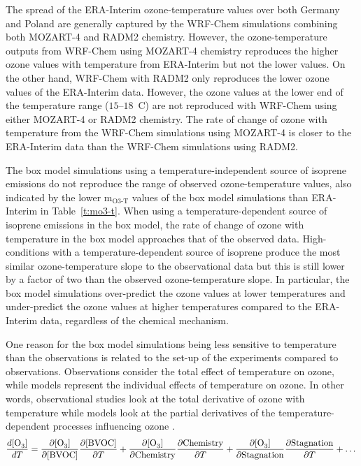 The spread of the ERA-Interim ozone-temperature values over both Germany and Poland are generally captured by the WRF-Chem simulations combining both MOZART-4 and RADM2 chemistry. 
However, the ozone-temperature outputs from WRF-Chem using MOZART-4 chemistry reproduces the higher ozone values with temperature from ERA-Interim but not the lower values.
On the other hand, WRF-Chem with RADM2 only reproduces the lower ozone values of the ERA-Interim data.
However, the ozone values at the lower end of the temperature range ($15$--$18$~\degree C) are not reproduced with WRF-Chem using either MOZART-4 or RADM2 chemistry.
The rate of change of ozone with temperature from the WRF-Chem simulations using MOZART-4 is closer to the ERA-Interim data than the WRF-Chem simulations using RADM2.

The box model simulations using a temperature-independent source of isoprene emissions do not reproduce the range of observed ozone-temperature values, also indicated by the lower m$_{\text{O3-T}}$ values of the box model simulations than ERA-Interim in Table~\ref{t:mo3-t}.
When using a temperature-dependent source of isoprene emissions in the box model, the rate of change of ozone with temperature in the box model approaches that of the observed data.
High- conditions with a temperature-dependent source of isoprene produce the most similar ozone-temperature slope to the observational data but this is still lower by a factor of two than the observed ozone-temperature slope.
In particular, the box model simulations over-predict the ozone values at lower temperatures and under-predict the ozone values at higher temperatures compared to the ERA-Interim data, regardless of the chemical mechanism.

One reason for the box model simulations being less sensitive to temperature than the observations is related to the set-up of the experiments compared to observations.
Observations consider the total effect of temperature on ozone, while models represent the individual effects of temperature on ozone. 
In other words, observational studies look at the total derivative of ozone with temperature while models look at the partial derivatives of the temperature-dependent processes influencing ozone \citep{Rasmussen:2013}. 
\begin{equation*} 
    \frac{d[\ce{O3}]}{dT} = \frac{\partial [\ce{O3}]}{\partial [\text{BVOC}]}\frac{\partial [\text{BVOC}]}{\partial T} + \frac{\partial [\ce{O3}]}{\partial \text{Chemistry}}\frac{\partial \text{Chemistry}}{\partial T} + \frac{\partial [\ce{O3}]}{\partial \text{Stagnation}}\frac{\partial \text{Stagnation}}{\partial T} + \dots
\end{equation*}


